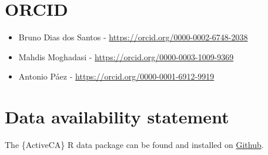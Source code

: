 \documentclass[Royal,times,sageh]{sagej}
\providecommand{\tightlist}{%
  \setlength{\itemsep}{0pt}\setlength{\parskip}{0pt}}
\begin{document}
\section{ORCID}\label{orcid}

\begin{itemize}
\tightlist
\item
  Bruno Dias dos Santos - \url{https://orcid.org/0000-0002-6748-2038}
\item
  Mahdis Moghadasi - \url{https://orcid.org/0000-0003-1009-9369}
\item
  Antonio Páez - \url{https://orcid.org/0000-0001-6912-9919}
\end{itemize}

\section{Data availability statement}\label{data-availability-statement}

The \{ActiveCA\} R data package can be found and installed on
\href{https://github.com/dias-bruno/ActiveCA}{Github}.



\end{document}
